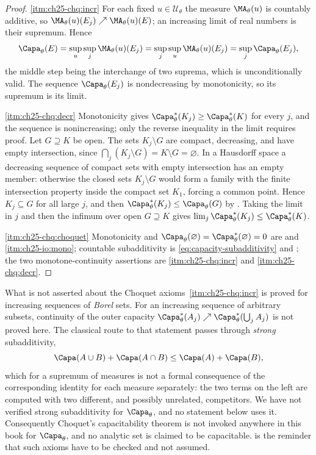 \begin{proof}
\cref{itm:ch25-chq:incr}  For each fixed $u\in\mathcal U_\theta$ the measure
$\MA_\theta(u)$ is countably additive, so
$\MA_\theta(u)(E_j)\nearrow\MA_\theta(u)(E)$; an increasing limit of real
numbers is their supremum.  Hence
\[
 \Capa_\theta(E)
 =\sup_u\sup_j\MA_\theta(u)(E_j)
 =\sup_j\sup_u\MA_\theta(u)(E_j)
 =\sup_j\Capa_\theta(E_j),
\]
the middle step being the interchange of two suprema, which is
unconditionally valid.  The sequence $\Capa_\theta(E_j)$ is nondecreasing
by monotonicity, so its supremum is its limit.

\cref{itm:ch25-chq:decr}  Monotonicity gives
$\Capa_\theta^*(K_j)\geq\Capa^*_\theta(K)$ for every $j$, and the
sequence is nonincreasing; only the reverse inequality in the limit requires
proof.  Let $G\supseteq K$ be open.  The sets $K_j\setminus G$ are
compact, decreasing, and have empty intersection, since
$\bigcap_j(K_j\setminus G)=K\setminus G=\varnothing$.  In a Hausdorff
space a decreasing sequence of compact sets with empty intersection has an
empty member: otherwise the closed sets $K_j\setminus G$ would form a
family with the finite intersection property inside the compact set
$K_1$, forcing a common point.  Hence $K_j\subseteq G$ for all large
$j$, and then
$\Capa^*_\theta(K_j)\leq\Capa_\theta(G)$ by
.  Taking the limit in $j$ and then the infimum
over open $G\supseteq K$ gives
$\lim_j\Capa^*_\theta(K_j)\leq\Capa^*_\theta(K)$.

\cref{itm:ch25-chq:choquet}  Monotonicity and
$\Capa_\theta(\varnothing)=\Capa^*_\theta(\varnothing)=0$ are
 and
\,\cref{itm:ch25-io:mono}; countable subadditivity
is \eqref{eq:capacity-subadditivity} and
; the two monotone-continuity assertions
are \cref{itm:ch25-chq:incr} and \cref{itm:ch25-chq:decr}.
\end{proof}

\begin{warning}{What is not asserted about the Choquet axioms}
\,\cref{itm:ch25-chq:incr} is proved for
increasing sequences of \emph{Borel} sets.  For an increasing sequence of
arbitrary subsets, continuity of the outer capacity
$\Capa^*_\theta(A_j)\nearrow\Capa^*_\theta(\bigcup_jA_j)$ is not proved
here.  The classical route to that statement passes through \emph{strong}
subadditivity,
\[
 \Capa(A\cup B)+\Capa(A\cap B)\leq\Capa(A)+\Capa(B),
\]
which for a supremum of measures is not a formal consequence of the
corresponding identity for each measure separately: the two terms on the left
are computed with two different, and possibly unrelated, competitors.  We
have not verified strong subadditivity for $\Capa_\theta$, and no statement
below uses it.  Consequently Choquet's capacitability theorem is not invoked
anywhere in this book for $\Capa_\theta$, and no analytic set is claimed to
be capacitable.   is the reminder that such
axioms have to be checked and not assumed.
\end{warning}

